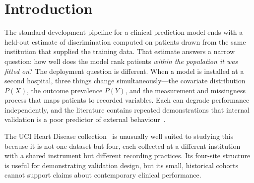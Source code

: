 \documentclass[manuscript,nonacm]{acmart}
\begin{document}
\renewcommand{\thefootnote}{\arabic{footnote}}

\section{Introduction}
The standard development pipeline for a clinical prediction model ends
with a held-out estimate of discrimination computed on patients drawn from the same
institution that supplied the training data. That estimate answers a narrow question:
how well does the model rank patients \emph{within the population it was fitted on}?
The deployment question is different. When a model is installed at a second hospital,
three things change simultaneously---the covariate distribution $P(X)$, the
outcome prevalence $P(Y)$, and the measurement and missingness process that maps
patients to recorded variables. Each can degrade performance independently, and the
literature contains repeated demonstrations that internal validation is a poor
predictor of external behaviour~\cite{steyerberg2016,futoma2020,zech2018}.

The UCI Heart Disease collection~\cite{detrano1989} is unusually well suited to
studying this because it is not one dataset but four, each collected at a different
institution with a shared instrument but different recording practices. Its four-site
structure is useful for demonstrating validation design, but its small, historical
cohorts cannot support claims about contemporary clinical performance.
\end{document}
